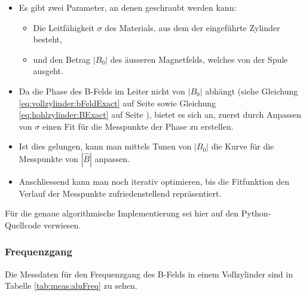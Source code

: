 \begin{itemize}
    \item
        Es gibt zwei Parameter, an denen geschraubt werden kann:
        \begin{itemize}
            \item
                Die  Leitf\"ahigkeit  $\sigma$  des  Materials,  aus  dem  der
                eingef\"uhrte Zylinder besteht,
            \item
                und den Betrag $|B_0|$ des \"ausseren Magnetfelds, welches von
                der Spule ausgeht.
        \end{itemize}
    \item
        Da   die   Phase   des   B-Felds   im   Leiter   nicht   von   $|B_0|$
        abh\"angt     (siehe    Gleichung     \ref{eq:vollzylinder:bFeldExact}
        auf       Seite       \pageref{eq:vollzylinder:bFeldExact}       sowie
        Gleichung        \ref{eq:hohlzylinder:BExact}         auf        Seite
        \pageref{eq:hohlzylinder:BExact}), bietet  es  sich an,  zuerst  durch
        Anpassen  von $\sigma$  einen Fit  f\"ur die  Messpunkte der  Phase zu
        erstellen.
    \item
        Ist dies gelungen, kann man mittels  Tunen von $|B_0|$ die Kurve f\"ur
        die Messpunkte von $|\hat{B}|$ anpassen.
    \item
        Anschliessend kann  man noch iterativ optimieren,  bis die Fitfunktion
        den Verlauf der Messpunkte zufriedenstellend repr\"asentiert.
\end{itemize}


F\"ur   die   genaue  algorithmische   Implementierung   sei   hier  auf   den
Python-Quellcode verwiesen. %

\subsubsection{Frequenzgang}
\label{sec:ausw:subsec:hohlz:subsubsec:steel}


Die Messdaten f\"ur den Frequenzgang des B-Felds in einem Vollzylinder sind in
Tabelle \ref{tab:meas:aluFreq} zu sehen.

